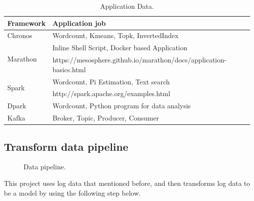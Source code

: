 \documentclass[12pt,oneside,openright,a4paper]{cpe-english-project}
\begin{document}
\begin{table}[!h]
  \caption{Application Data.}\label{tbl:ApplicationData}
    \begin{tabular}{@{}|p{}|p{}|}
    \hline
    \textbf{Framework} & \textbf{Application job}\\
    \hline
    Chronos & Wordcount, Kmeans, Topk, InvertedIndex\\
    \hline
    \multirow{2}{*}{Marathon} & Inline Shell Script, Docker based Application \\
    & https://mesosphere.github.io/marathon/docs/application-basics.html\\
    \hline
    \multirow{2}{*}{Spark} & Wordcount, Pi Estimation, Text search\\
    & http://spark.apache.org/examples.html\\
    \hline
    Dpark & Wordcount, Python program for data analysis\\
    \hline
    Kafka & Broker, Topic, Producer, Consumer\\
    \hline
  \end{tabular}
\end{table}

\newpage

\subsection{Transform data pipeline}

\begin{figure}[!h]\centering
  \setlength{\fboxrule}{0mm} %
  \setlength{\fboxsep}{0cm}
  \caption{Data pipeline.}\label{fig:dataPipeline}
\end{figure}

This project uses log data that mentioned before, and then transforms log data to be a model by using the following step below.
\end{document}
